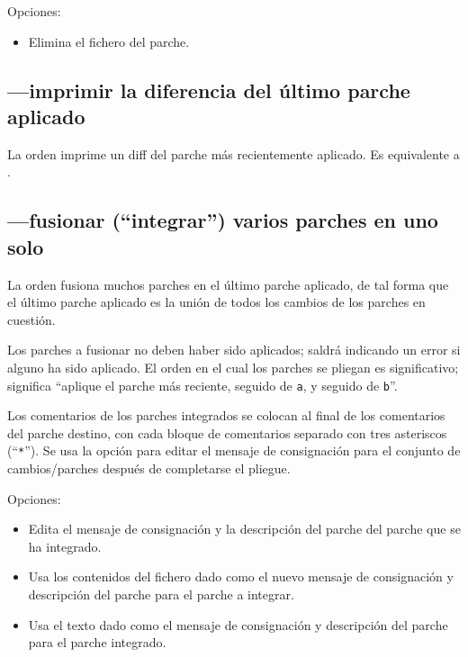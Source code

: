 Opciones:
\begin{itemize}
\item[\hgxopt{mq}{qdel}{-f}] Elimina el fichero del parche.
\end{itemize}

\subsection{---imprimir la diferencia del último
  parche aplicado}

La orden  imprime un diff del parche más
recientemente aplicado.  Es equivalente a .

\subsection{---fusionar (``integrar'') varios parches en
  uno solo}

La orden  fusiona muchos parches en el último parche
aplicado, de tal forma que el último parche aplicado es la unión de
todos los cambios de los parches en cuestión.

Los parches a fusionar no deben haber sido aplicados;
 saldrá indicando un error si alguno ha sido
aplicado.  El orden en el cual los parches se pliegan es
significativo;  significa ``aplique el parche
más reciente, seguido de \texttt{a}, y seguido de \texttt{b}''.

Los comentarios de los parches integrados se colocan al final de los
comentarios del parche destino, con cada bloque de comentarios
separado con tres asteriscos (``\texttt{*}'').  Se usa la opción
 para editar el mensaje de consignación para el
conjunto de cambios/parches después de completarse el pliegue.

Opciones:
\begin{itemize}
\item[\hgxopt{mq}{qfold}{-e}] Edita el mensaje de consignación y la
  descripción del parche del parche que se ha integrado.
\item[\hgxopt{mq}{qfold}{-l}] Usa los contenidos del fichero dado como
  el nuevo mensaje de consignación y descripción del parche para el
  parche a integrar.
\item[\hgxopt{mq}{qfold}{-m}] Usa el texto dado como el mensaje de
  consignación y descripción del parche para el parche integrado.
\end{itemize}

